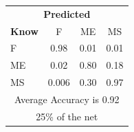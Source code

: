 \documentclass[12pt]{article} %
\begin{document}
\begin{minipage}{0.5\textwidth}
\begin{center}
\begin{tabular}{l|c|c|c|}
 \multicolumn{4}{c}{ \textbf{ Predicted}}\\
 \textbf{Know}&F&ME&MS\\ \hline\hline
F   &0.98&0.01&0.01\\
ME &0.02&0.80&0.18\\
MS &0.006&0.30&0.97\\
\multicolumn{4}{c}{Average Accuracy is 0.92}\\
\multicolumn{4}{c}{25\%  of the net}\\
\end{tabular}
\end{center}
\end{minipage}
\end{document}
